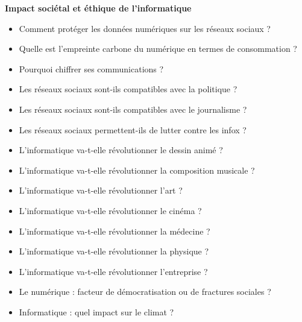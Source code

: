 \textbf{Impact sociétal et éthique de l’informatique}
\begin{itemize}
    \item Comment protéger les données numériques sur les réseaux sociaux ?
    \item Quelle est l’empreinte carbone du numérique en termes de consommation ?
    \item Pourquoi chiffrer ses communications ?
    \item Les réseaux sociaux sont-ils compatibles avec la politique ?
    \item Les réseaux sociaux sont-ils compatibles avec le journalisme ?
    \item Les réseaux sociaux permettent-ils de lutter contre les infox ?
    \item L’informatique va-t-elle révolutionner le dessin animé ?
    \item L’informatique va-t-elle révolutionner la composition musicale ?
    \item L’informatique va-t-elle révolutionner l’art ?
    \item L’informatique va-t-elle révolutionner le cinéma ?
    \item L’informatique va-t-elle révolutionner la médecine ?
    \item L’informatique va-t-elle révolutionner la physique ?
    \item L’informatique va-t-elle révolutionner l’entreprise ?
    \item Le numérique : facteur de démocratisation ou de fractures sociales ?
    \item Informatique : quel impact sur le climat ?
\end{itemize}



